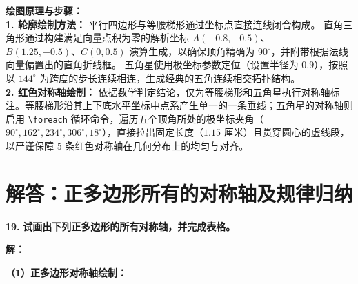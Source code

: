 \vspace{0.4cm}
{\small\color{blue!70!black}
\textbf{绘图原理与步骤：}\\
\textbf{1. 轮廓绘制方法：} 
平行四边形与等腰梯形通过坐标点直接连线闭合构成。
直角三角形通过构建满足向量点积为零的解析坐标 $A(-0.8, -0.5)$、$B(1.25, -0.5)、C(0, 0.5)$ 演算生成，以确保顶角精确为 $90^\circ$，并附带根据法线向量偏置出的直角折线框。
五角星使用极坐标参数定位（设置半径为 $0.9$），按照以 $144^\circ$ 为跨度的步长连续相连，生成经典的五角连续相交拓扑结构。\\
\textbf{2. 红色对称轴绘制：} 依据数学判定结论，仅为等腰梯形和五角星执行对称轴标注。等腰梯形沿其上下底水平坐标中点系产生单一的一条垂线；五角星的对称轴则启用 \texttt{\textbackslash{}foreach} 循环命令，遍历五个顶角所处的极坐标夹角（$90^\circ, 162^\circ, 234^\circ, 306^\circ, 18^\circ$），直接拉出固定长度（$1.15$ 厘米）且贯穿圆心的虚线段，以严谨保障 5 条红色对称轴在几何分布上的均匀与对齐。
}
\newpage



\section{解答：正多边形所有的对称轴及规律归纳}

\vspace{0.6cm}

\textbf{\LARGE 19.} \textbf{试画出下列正多边形的所有对称轴，并完成表格。}

\vspace{0.4cm}
\textbf{解：}

\textbf{（1）正多边形对称轴绘制：}

